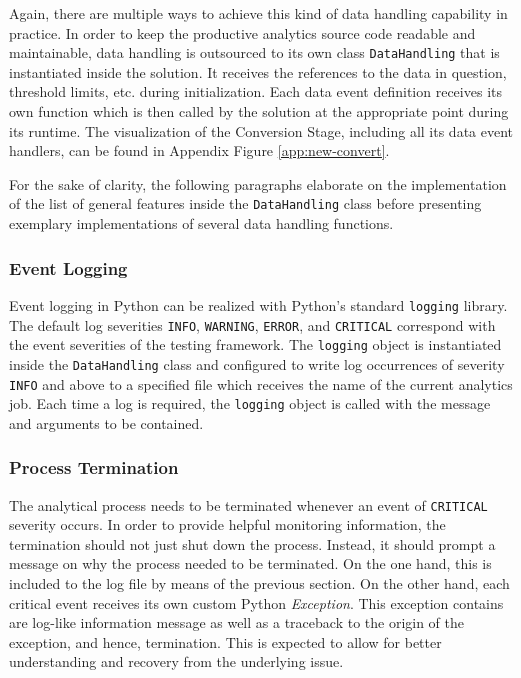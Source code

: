 Again, there are multiple ways to achieve this kind of data handling capability in practice. In order to keep the productive analytics source code readable and maintainable, data handling is outsourced to its own class \texttt{DataHandling} that is instantiated inside the solution. It receives the references to the data in question, threshold limits, etc. during initialization. Each data event definition receives its own function which is then called by the solution at the appropriate point during its runtime. The visualization of the Conversion Stage, including all its data event handlers, can be found in Appendix Figure \ref{app:new-convert}.

For the sake of clarity, the following paragraphs elaborate on the implementation of the list of general features inside the \texttt{DataHandling} class before presenting exemplary implementations of several data handling functions.

\subsubsection{Event Logging}
Event logging in Python can be realized with Python's standard \texttt{logging} library. The default log severities \texttt{INFO}, \texttt{WARNING}, \texttt{ERROR}, and \texttt{CRITICAL} correspond with the event severities of the testing framework. The \texttt{logging} object is instantiated inside the \texttt{DataHandling} class and configured to write log occurrences of severity \texttt{INFO} and above to a specified file which receives the name of the current analytics job. Each time a log is required, the \texttt{logging} object is called with the message and arguments to be contained.

\subsubsection{Process Termination}
The analytical process needs to be terminated whenever an event of \texttt{CRITICAL} severity occurs. In order to provide helpful monitoring information, the termination should not just shut down the process. Instead, it should prompt a message on why the process needed to be terminated. On the one hand, this is included to the log file by means of the previous section. On the other hand, each critical event receives its own custom Python \textit{Exception}. This exception contains are log-like information message as well as a traceback to the origin of the exception, and hence, termination. This is expected to allow for better understanding and recovery from the underlying issue.

